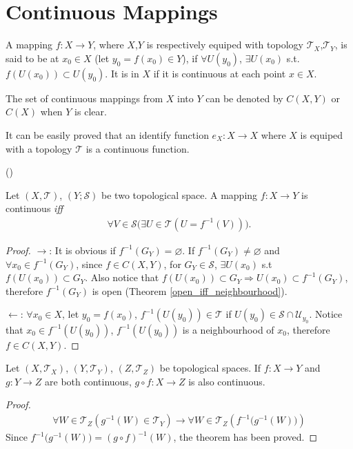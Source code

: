 \documentclass[openany]{book}
\begin{document}
\section{Continuous Mappings}
\begin{definition}\label{continuousness}
A mapping $f\colon X\to Y$, where $X$,$Y$ is respectively equiped with topology $\mathscr{T}_X$,$\mathscr{T}_Y$, is said to be  at $x_0\in X$ (let $y_0 = f( x_0 ) \in Y$), if $\forall U( y_0 )$, $\exists U( x_0 )$ s.t. $f( U(x_0) )\subset U( y_0 )$. It is  in $X$ if it is continuous at each point $x\in X$. 
\end{definition}

The set of continuous mappings from $X$ into $Y$ can be denoted by $C(X,Y)$ or $C(X)$ when $Y$ is clear. 

It can be easily proved that an identify function $e_X\colon X\to X$ where $X$ is equiped with a topology $\mathscr T$ is a continuous function.

\begin{theorem}\label{criterion_continuity} ()

Let $(X, \mathscr T)$, $(Y; \mathscr S)$ be two topological space. A mapping $f \colon X \to Y$ is continuous \emph{iff}
\begin{align*}
	\forall V\in \mathscr S\big(
		\exists U \in \mathscr T(
			U=f^{-1}(V) ) \big).
\end{align*}
\end{theorem}
\begin{proof}
$\rightarrow$: It is obvious if $f  ^{-1}(G_Y) = \varnothing$. 
If $f  ^{-1}(G_Y) \neq \varnothing$ and $\forall x_0 \in f  ^{-1}(G_Y)$, 
since $f \in C(X,Y)$, for $G_Y \in \mathscr S$, $\exists U( x_0) $ s.t $f ( U( x_0)) \subset G_Y$. 
Also notice that $f ( U( x_0)) \subset G_Y \Rightarrow U( x_0) \subset f  ^{-1}(G_Y)$, therefore $f  ^{-1}(G_Y) $ is open (Theorem \ref{open_iff_neighbourhood}).

$\leftarrow$: $\forall x_0 \in X$, let $y_0 = f ( x_0)$, $f ^{-1} ( U( y_0)) \in \mathscr{T}$ if $U(y_0) \in \mathscr S\cap \mathscr U_{y_0}$.
Notice that $x_0 \in f ^{-1} ( U( y_0))$, $ f ^{-1} ( U( y_0))$ is a neighbourhood of $x_0$, therefore $f \in C( X, Y) $.
\end{proof}

\begin{theorem}
	Let $(X, \mathscr T_X)$, $(Y, \mathscr T_Y)$, $(Z, \mathscr T_Z)$ be topological spaces.
	If $f\colon X\to Y$ and $g\colon Y\to Z$ are both continuous, $g\circ f\colon X\to Z$ is also continuous. 
\end{theorem}
\begin{proof}
\begin{align*}
	\forall W\in \mathscr T_Z\left(
		g^{-1} (W)\in \mathscr T_Y\right) \rightarrow 
			\forall W\in \mathscr T_Z\left(
				f^{-1}\big( 
					g^{-1} (W)\big)\right)
\end{align*}
Since $f^{-1}\big(  g^{-1} (W)\big) = ( g\circ f)^{-1} (W)$, the theorem has been proved.
\end{proof}
\end{document}
